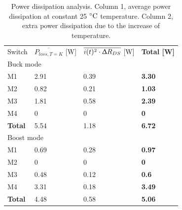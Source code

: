 \begin{table}[]
	\centering
	\begin{tabular}{|l|l|l|l|}
		\hline
		\rowcolor[HTML]{C0C0C0} 
		\multicolumn{4}{|c|}{\cellcolor[HTML]{C0C0C0}\textbf{Switches power dissipation}}                                                   \\ \hline
		\rowcolor[HTML]{C0C0C0} 
		Switch         & $\overline{P_{loss, T = K}}$ {[}W{]} & $ \overline{i(t)^2 \cdot \Updelta R_{DS}}$ {[}W{]} & \textbf{Total {[}W{]}} \\ \hline
		\multicolumn{4}{|l|}{Buck mode}                                                                                                     \\ \hline
		M1             & 2.91                                 & 0.39                                               & \textbf{3.30}          \\ \hline
		M2             & 0.82                                 & 0.21                                               & \textbf{1.03}          \\ \hline
		M3             & 1.81                                 & 0.58                                               & \textbf{2.39}          \\ \hline
		M4             & 0                                    & 0                                                  & \textbf{0}             \\ \hline
		\textbf{Total} & 5.54                                 & 1.18                                               & \textbf{6.72}          \\ \hline
		\multicolumn{4}{|l|}{Boost mode}                                                                                                    \\ \hline
		M1             & 0.69                                 & 0.28                                               & \textbf{0.97}          \\ \hline
		M2             & 0                                    & 0                                                  & \textbf{0}             \\ \hline
		M3             & 0.48                                 & 0.12                                               & \textbf{0.6}           \\ \hline
		M4             & 3.31                                 & 0.18                                               & \textbf{3.49}          \\ \hline
		\textbf{Total} & 4.48                                 & 0.58                                               & \textbf{5.06}          \\ \hline
	\end{tabular}
\caption{Power dissipation analysis. Column 1, average power dissipation at constant 25 $\decC$ temperature. Column 2, extra power dissipation due to the increase of temperature.}
\label{mosfet_final_dissipation}
\end{table}


